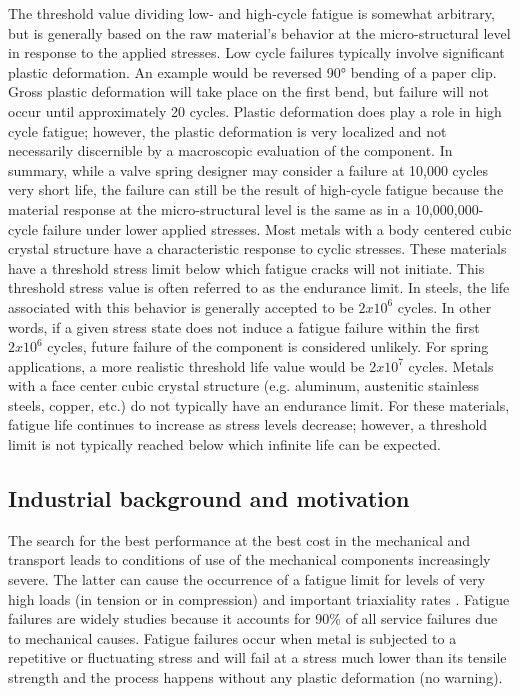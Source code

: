 \documentclass[3p,times,procedia,number]{elsarticle}
\begin{document}
 The threshold value dividing low- and high-cycle fatigue is somewhat arbitrary, but is generally
based on the raw material’s behavior at the micro-structural level in response to the applied stresses. Low cycle
failures typically involve significant plastic deformation. An example would be reversed 90° bending
of a paper clip. Gross plastic deformation will take place on the first bend, but failure will not occur until
approximately 20 cycles. Plastic deformation does play a role in high cycle fatigue; however, the plastic
deformation is very localized and not necessarily discernible by a macroscopic evaluation of the
component. In summary, while a valve spring designer may consider a failure at 10,000 cycles very short
life, the failure can still be the result of high-cycle fatigue because the material response at the
micro-structural level is the same as in a 10,000,000-cycle failure under lower applied stresses.
Most metals with a body centered cubic crystal structure have a characteristic response to cyclic stresses.
These materials have a threshold stress limit below which fatigue cracks will not initiate. This threshold
stress value is often referred to as the endurance limit. In steels, the life associated with this behavior is
generally accepted to be $2x10^6$
cycles. In other words, if a given stress state does not induce a fatigue
failure within the first $2x10^6$
cycles, future failure of the component is considered unlikely. For spring
applications, a more realistic threshold life value would be $2x10^7$ cycles. Metals with a face center cubic
crystal structure (e.g. aluminum, austenitic stainless steels, copper, etc.) do not typically have an endurance
limit. For these materials, fatigue life continues to increase as stress levels decrease; however, a threshold
limit is not typically reached below which infinite life can be expected.

\subsection{Industrial background and motivation}
The search for the best performance at the best cost in the mechanical and
transport leads to conditions of use of the mechanical components increasingly
severe. The latter can cause the occurrence of a fatigue limit for levels of
very high loads (in tension or in compression) and important triaxiality rates
. Fatigue failures are widely studies
because it accounts for 90\% of all service
failures due to mechanical causes.  Fatigue failures occur when metal is
subjected to a repetitive or fluctuating
stress and will fail at a stress much lower
than its tensile strength and the process happens without any plastic
deformation (no warning).
\end{document}
